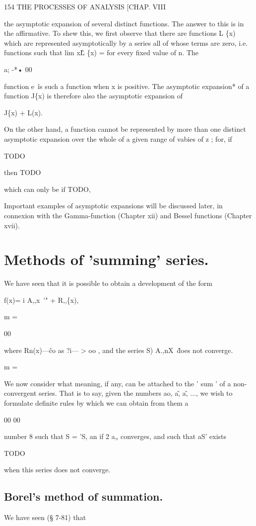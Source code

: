 154 THE PROCESSES OF ANALYSIS [CHAP. VIII

the asymptotic expansion of several distinct functions. The answer to this
is in the affirmative. To shew this, we first observe that there are functions
L \{x) which are represented asymptotically by a series all of whose terms are
zero, i.e. functions such that lim x\^L \{x) = for every fixed value of n. The

a; -*• 00

function e~\^ is such a function when x is positive. The asymptotic expansion*
of a function J\{x) is therefore also the asymptotic expansion of

J\{x) + L(x).

On the other hand, a function cannot be represented by more than one distinct
asymptotic expansion over the whole of a given range of vabies of z ; for, if

TODO

then TODO

which can only be if TODO,

Important examples of asymptotic expansions will be discussed later, in connexion
with the Gamma-function (Chapter xii) and Bessel functions (Chapter xvii).

\section{Methods of 'summing' series.}

We have seen that it is possible to obtain a development of the form

f(x)= i A,,x~'" + R,,\{x),

m =

00

where Rn(x)—\^ co as ?i— > oo , and the series S) A.,nX~\^ does not converge.

m =

We now consider what meaning, if any, can be attached to the ' sum ' of
a non- convergent series. That is to say, given the numbers ao, a\^, a\^, ...,
we wish to formulate definite rules by which we can obtain from them a

00 00

number 8 such that S = 'S, an if 2 a„ converges, and such that aS' exists

TODO

when this series does not converge.

\subsection{Borel's method of summation.}
We have seen (§ 7-81) that

